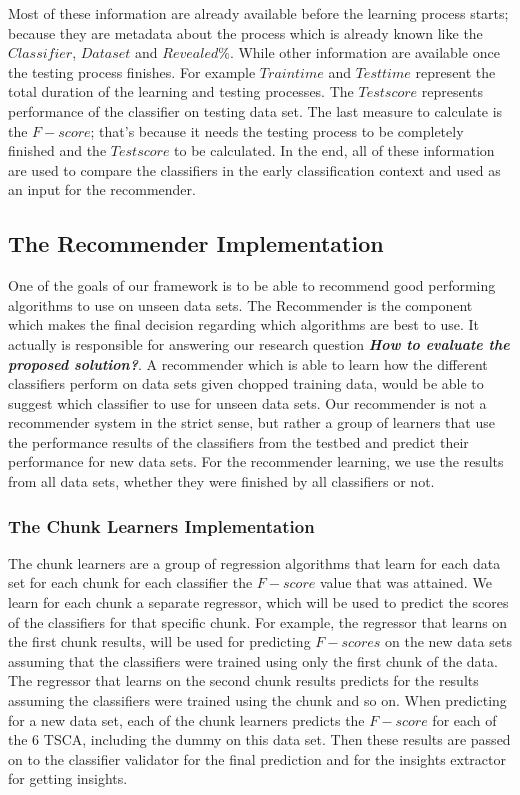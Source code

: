 Most of these information are already available before the learning process starts; because they are metadata about the process which is already known like the $Classifier$, $Data set$ and $Revealed \%$.
While other information are available once the testing process finishes. For example $Train time$ and $Test time$ represent the total duration of the learning and testing processes.
The $Test score$ represents performance of the classifier on testing data set.
The last measure to calculate is the $F-score$; that's because it needs the testing process to be completely finished and the $Test score$ to be calculated.
In the end, all of these information are used to compare the classifiers in the early classification context and used as an input for the recommender.

\subsection{The Recommender Implementation}
\label{SubsectionRecommenderImplementation}
One of the goals of our framework is to be able to recommend good performing algorithms to use on unseen data sets.
The Recommender is the component which makes the final decision regarding which algorithms are best to use.
It actually is responsible for answering our research question \textbf{\textit{How to evaluate the proposed solution?}}.
A recommender which is able to learn how the different classifiers perform on data sets given chopped training data,
would be able to suggest which classifier to use for unseen data sets.
Our recommender is not a recommender system in the strict sense, but rather a group of learners that use the performance results of the classifiers from the testbed
and predict their performance for new data sets. For the recommender learning, we use the results from all data sets, whether they were finished by all classifiers or not.

\subsubsection*{The Chunk Learners Implementation}
\label{ChunkLearnersImplementation}
The chunk learners are a group of regression algorithms that learn for each data set for each chunk for each classifier the $F-score$ value that was attained.
We learn for each chunk a separate regressor, which will be used to predict the scores of the classifiers for that specific chunk.
For example, the regressor that learns on the first chunk results, will be used for predicting $F-scores$ on the new data sets assuming that the classifiers were trained using only the first chunk of the data.
The regressor that learns on the second chunk results predicts for the results assuming the classifiers were trained using the  chunk and so on.
When predicting for a new data set, each of the chunk learners predicts the $F-score$ for each of the 6 TSCA, including the dummy on this data set.
Then these results are passed on to the classifier validator for the final prediction and for the insights extractor for getting insights.

